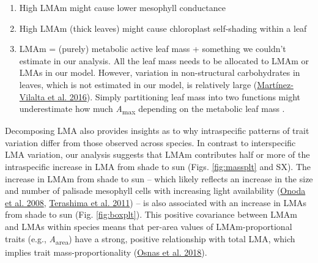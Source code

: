 \documentclass[
  12pt,
]{article}
\providecommand{\tightlist}{%
  \setlength{\itemsep}{0pt}\setlength{\parskip}{0pt}}
\begin{document}
\begin{enumerate}
\def\labelenumi{\arabic{enumi}.}
\tightlist
\item
  High LMAm might cause lower mesophyll conductance
\item
  High LMAm (thick leaves) might cause chloroplast self-shading within a leaf
\item
  LMAm = (purely) metabolic active leaf mass + something we couldn't estimate in our analysis. All the leaf mass needs to be allocated to LMAm or LMAs in our model. However, variation in non-structural carbohydrates in leaves, which is not estimated in our model, is relatively large (\protect\hyperlink{ref-Martinez-Vilalta2016}{Martínez-Vilalta et al. 2016}). Simply partitioning leaf mass into two functions might underestimate how much \emph{A}\textsubscript{max} depending on the metabolic leaf mass .
\end{enumerate}

Decomposing LMA also provides insights as to why intraspecific patterns of trait variation differ from those observed across species.
In contrast to interspecific LMA variation, our analysis suggests that LMAm contributes half or more of the intraspecific increase in LMA from shade to sun (Figs. \ref{fig:massplt} and SX).
The increase in LMAm from shade to sun -- which likely reflects an increase in the size and number of palisade mesophyll cells with increasing light availability (\protect\hyperlink{ref-Onoda2008}{Onoda et al. 2008}, \protect\hyperlink{ref-Terashima2011}{Terashima et al. 2011}) -- is also associated with an increase in LMAs from shade to sun (Fig. \ref{fig:boxplt}).
This positive covariance between LMAm and LMAs within species means that per-area values of LMAm-proportional traits (e.g., \emph{A}\textsubscript{area}) have a strong, positive relationship with total LMA, which implies trait mass-proportionality (\protect\hyperlink{ref-Osnas2018}{Osnas et al. 2018}).
\end{document}
